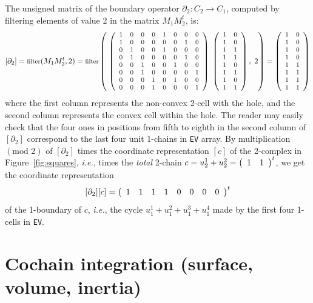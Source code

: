 {\begin{remark}
\begin{end}
\begin{coding}
The unsigned matrix of the boundary operator $\partial_2 : C_2\to C_1$, computed by filtering elements of value 2 in the matrix $M_1 M_2^t$, is:
\[\small
[\partial_2] = \mbox{filter}(M_1M_2^t,2) = \mbox{filter}\left(\ 
\mat{
1 & 0 & 0 & 0 & 1 & 0 & 0 & 0\\
1 & 0 & 0 & 0 & 0 & 0 & 1 & 0\\
0 & 1 & 0 & 0 & 1 & 0 & 0 & 0\\
0 & 1 & 0 & 0 & 0 & 0 & 1 & 0\\
0 & 0 & 1 & 0 & 0 & 1 & 0 & 0\\
0 & 0 & 1 & 0 & 0 & 0 & 0 & 1\\
0 & 0 & 0 & 1 & 0 & 1 & 0 & 0\\
0 & 0 & 0 & 1 & 0 & 0 & 0 & 1}\,\ 
\mat{
1 & 0\\
1 & 0\\
1 & 1\\
1 & 1\\
1 & 0\\
1 & 1\\
1 & 0\\
1 & 1\\
}\,,\ 2\right)=
\mat{
1 & 0\\
1 & 0\\
1 & 0\\
1 & 0\\
1 & 1\\
1 & 1\\
1 & 1\\
1 & 1\\
}
\]
where the first column represents the non-convex 2-cell with the hole, and the second column  represents the convex cell within the hole. The reader may easily check that the four ones in positions from fifth to eighth in the second column of $[\partial_2]$ correspond to the last four unit 1-chains in \texttt{EV} array.
By multiplication $(\mbox{mod 2})$ of $[\partial_2]$ times the coordinate representation $[c]$ of the 2-complex in Figure~\ref{fig:squares}, \emph{i.e.}, times the \emph{total} 2-chain $ c = u_2^1 + u_2^2 = {\left(\begin{array}{cccccccc}1 & 1\end{array}\right)}^t$, we get the coordinate representation
\[
[\partial_2][c] = {\left(\begin{array}{cccccccc}1 & 1& 1& 1& 0& 0& 0& 0\end{array}\right)}^t
\]
of the 1-boundary of  $c$, \emph{i.e.}, the cycle $u_1^1 + u_1^2 + u_1^3 + u_1^4$ made by the first four 1-cells in \texttt{EV}. 
\end{coding}




\section{Cochain integration (surface, volume, inertia)}\label{sect:3-4}


\end{end}
\end{remark}}
